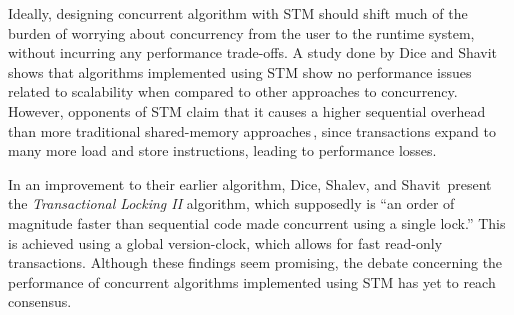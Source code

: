 Ideally, designing concurrent algorithm with STM should shift much of the burden of worrying about concurrency from the user to the runtime system, without incurring any performance trade-offs. A study done by Dice and Shavit\,\citep{Dice06whatreally} shows that algorithms implemented using STM show no performance issues related to scalability when compared to other approaches to concurrency. However, opponents of STM claim that it causes a higher sequential overhead than more traditional shared-memory approaches\,\citep{Cascaval08}, since transactions expand to many more load and store instructions, leading to performance losses.

In an improvement to their earlier algorithm, Dice, Shalev, and Shavit\,\citep{DiceTLII} present the \emph{Transactional Locking II} algorithm, which supposedly is ``an order of magnitude faster than sequential code made concurrent using a single lock.'' This is achieved using a global version-clock, which allows for fast read-only transactions. Although these findings seem promising, the debate concerning the performance of concurrent algorithms implemented using STM has yet to reach consensus.
